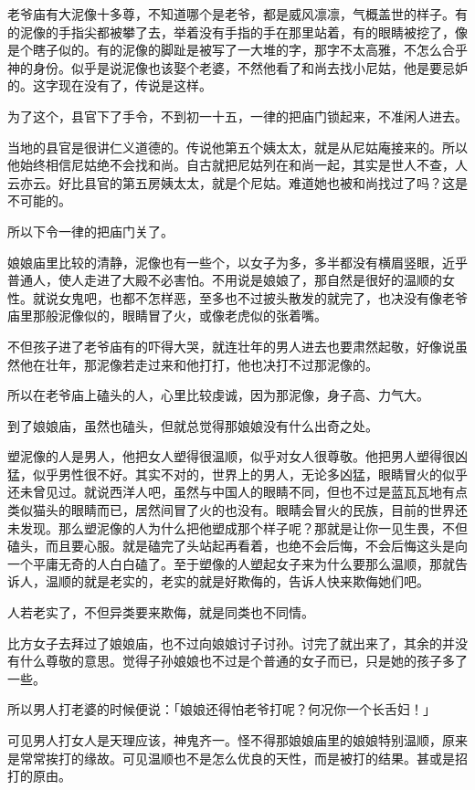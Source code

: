 \documentclass[UTF8]{ctexart}
\begin{document}
老爷庙有大泥像十多尊，不知道哪个是老爷，都是威风凛凛，气概盖世的样子。有的泥像的手指尖都被攀了去，举着没有手指的手在那里站着，有的眼睛被挖了，像是个瞎子似的。有的泥像的脚趾是被写了一大堆的字，那字不太高雅，不怎么合乎神的身份。似乎是说泥像也该娶个老婆，不然他看了和尚去找小尼姑，他是要忌妒的。这字现在没有了，传说是这样。

为了这个，县官下了手令，不到初一十五，一律的把庙门锁起来，不准闲人进去。

当地的县官是很讲仁义道德的。传说他第五个姨太太，就是从尼姑庵接来的。所以他始终相信尼姑绝不会找和尚。自古就把尼姑列在和尚一起，其实是世人不查，人云亦云。好比县官的第五房姨太太，就是个尼姑。难道她也被和尚找过了吗？这是不可能的。

所以下令一律的把庙门关了。

娘娘庙里比较的清静，泥像也有一些个，以女子为多，多半都没有横眉竖眼，近乎普通人，使人走进了大殿不必害怕。不用说是娘娘了，那自然是很好的温顺的女性。就说女鬼吧，也都不怎样恶，至多也不过披头散发的就完了，也决没有像老爷庙里那般泥像似的，眼睛冒了火，或像老虎似的张着嘴。

不但孩子进了老爷庙有的吓得大哭，就连壮年的男人进去也要肃然起敬，好像说虽然他在壮年，那泥像若走过来和他打打，他也决打不过那泥像的。

所以在老爷庙上磕头的人，心里比较虔诚，因为那泥像，身子高、力气大。

到了娘娘庙，虽然也磕头，但就总觉得那娘娘没有什么出奇之处。

塑泥像的人是男人，他把女人塑得很温顺，似乎对女人很尊敬。他把男人塑得很凶猛，似乎男性很不好。其实不对的，世界上的男人，无论多凶猛，眼睛冒火的似乎还未曾见过。就说西洋人吧，虽然与中国人的眼睛不同，但也不过是蓝瓦瓦地有点类似猫头的眼睛而已，居然间冒了火的也没有。眼睛会冒火的民族，目前的世界还未发现。那么塑泥像的人为什么把他塑成那个样子呢？那就是让你一见生畏，不但磕头，而且要心服。就是磕完了头站起再看着，也绝不会后悔，不会后悔这头是向一个平庸无奇的人白白磕了。至于塑像的人塑起女子来为什么要那么温顺，那就告诉人，温顺的就是老实的，老实的就是好欺侮的，告诉人快来欺侮她们吧。

人若老实了，不但异类要来欺侮，就是同类也不同情。

比方女子去拜过了娘娘庙，也不过向娘娘讨子讨孙。讨完了就出来了，其余的并没有什么尊敬的意思。觉得子孙娘娘也不过是个普通的女子而已，只是她的孩子多了一些。

所以男人打老婆的时候便说：「娘娘还得怕老爷打呢？何况你一个长舌妇！」

可见男人打女人是天理应该，神鬼齐一。怪不得那娘娘庙里的娘娘特别温顺，原来是常常挨打的缘故。可见温顺也不是怎么优良的天性，而是被打的结果。甚或是招打的原由。
\end{document}
